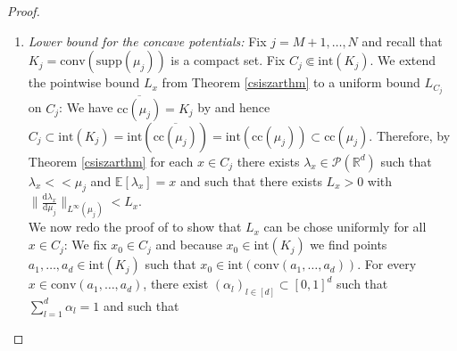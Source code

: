 \documentclass[letterpaper]{amsart}
\newcommand{\RR}{\mathbb{R}}
\newcommand{\EE}{\mathbb{E}}
\newcommand{\dd}{\mathrm{d}}
\theoremstyle{definition}
\begin{document}
\begin{proof}
\begin{enumerate}
\begin{gather*}
	\end{gather*}
	and integrating with respect to the product measure
	\begin{gather*}
		\gamma_{-j}\coloneqq\mu_1\otimes\dots\mu_{j-1}\otimes\mu_{j+1}\otimes\dots\otimes\mu_N
	\end{gather*} we get a uniform upper bound for $\varphi_j^n$ through
	\begin{align*}
		\varphi_j^n(x_j)&\leq\int_{\Omega^{d-1}}\bar c(x_1,\dots,x_N)\ \dd\gamma_{-j}-\sum_{i\neq j}\int_{\Omega}\varphi_i^n(x_i)\ \dd\mu_i(x_i)\\
		&\leq\int_{\Omega^{d-1}}\bar c(x_1,\dots,x_N)\ \dd\gamma_{-j}-\sum_{i=1}^N\int_{\Omega}\varphi_i^n(x_i)\ \dd\mu_i(x_i)\\
		&\leq C
	\end{align*}
	where in the second line we have used \eqref{integralbound} and in the third line we have used the boundedness of $\bar c$ over $\Omega$ and \eqref{lowerboundmaximization}.\\
	For $j=N$ (the unnormalized concave $\varphi_N^n$) we get the upper bound
	\begin{gather*}
		\varphi_N^n(x_N)\leq\bar c(\EE[\mu_1],\dots,\EE[\mu_{N-1}],x_N)\leq C
	\end{gather*}
	using again the boundedness of $\bar c$ over $\Omega$.
	\item \textit{Lower bound for the concave potentials:}
	Fix $j=M+1,\dots,N$ and recall that $K_j=\text{conv}(\text{supp}(\mu_j))$ is a compact set. Fix $C_j\Subset \text{int}(K_j)$. We extend the pointwise bound $L_x$ from Theorem \ref{csiszarthm} to a uniform bound $L_{C_j}$ on $C_j$: We have $\overline{\text{cc}(\mu_j)}=K_j$ by \cite[Lma 1]{csiszar2001} and hence $C_j\subset\text{int}(K_j)=\text{int}(\overline{\text{cc}(\mu_j)})=\text{int}(\text{cc}(\mu_j))\subset\text{cc}(\mu_j)$. Therefore, by Theorem \ref{csiszarthm} for each $x\in C_j$ there exists $\lambda_x\in\mathcal P(\RR^d)$ such that $\lambda_x<<\mu_j$ and $\EE[\lambda_x]=x$ and such that there exists $L_x>0$ with $\|\frac{\dd\lambda_x}{\dd\mu_j}\|_{L^\infty(\mu_j)}<L_x$.\\ We now redo the proof of \cite[Thm 3]{csiszar2001} to show that $L_x$ can be chose uniformly for all $x\in C_j$:
	We fix $x_0\in C_j$ and because $x_0\in\text{int}(K_j)$ we find points $a_1,\dots,a_d\in\text{int}(K_j)$ such that $x_0\in\text{int}(\text{conv}(a_1,\dots,a_d))$. For every $x\in\text{conv}(a_1,\dots,a_d)$, there exist $(\alpha_l)_{l\in[d]}\subset[0,1]^d$ such that $\sum_{l=1}^d\alpha_l=1$ and such that

\end{enumerate}
\end{proof}
\end{document}
